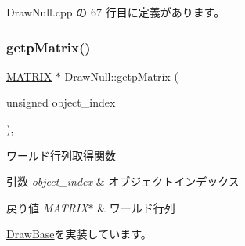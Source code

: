  Draw\+Null.\+cpp の 67 行目に定義があります。

\mbox{\label{class_draw_null_a9aac059eb3b5d1f77e8bd3aa0647cff9}} 
\subsubsection{\texorpdfstring{getp\+Matrix()}{getpMatrix()}}
{\footnotesize\ttfamily \mbox{\hyperlink{_matrix_8h_a032295cd9fb1b711757c90667278e744}{M\+A\+T\+R\+IX}} $\ast$ Draw\+Null\+::getp\+Matrix (\begin{DoxyParamCaption}\item[{unsigned}]{object\+\_\+index }\end{DoxyParamCaption})\hspace{0.3cm}{\ttfamily [override]}, {\ttfamily [virtual]}}



ワールド行列取得関数 


\begin{DoxyParams}{引数}
{\em object\+\_\+index} & オブジェクトインデックス \\
\hline
\end{DoxyParams}

\begin{DoxyRetVals}{戻り値}
{\em M\+A\+T\+R\+I\+X$\ast$} & ワールド行列 \\
\hline
\end{DoxyRetVals}


\mbox{\hyperlink{class_draw_base_a60fc3148b2679e4ea7723d2af0c37283}{Draw\+Base}}を実装しています。



